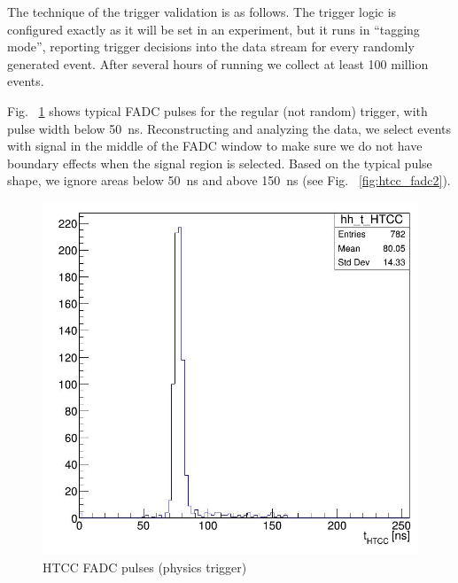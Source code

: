 The technique of the trigger validation is as follows. The trigger logic is configured exactly as it will be set in an experiment, but it runs in ``tagging mode'', reporting trigger decisions into the data stream for every randomly generated event. After several hours of running we collect at least 100 million events.

Fig. ~\ref{fig:htcc_fadc1} shows typical FADC pulses for the regular (not random) trigger, with pulse width below 50~ns. Reconstructing and analyzing the data, we select events with signal in the middle of the FADC window to make sure we do not have boundary effects when the signal region is selected. Based on the typical pulse shape, we ignore areas below 50~ns and above 150~ns (see Fig. ~\ref{fig:htcc_fadc2}).

\begin{figure}[hbt]
	\centering
	\includegraphics[width=1.0\columnwidth,keepaspectratio]{img/htcc_fadc1.png}
	\caption{HTCC FADC pulses (physics trigger)}
	\label{fig:htcc_fadc1}
\end{figure}

